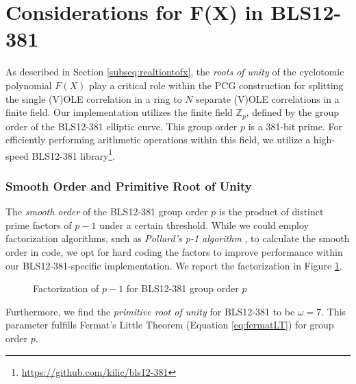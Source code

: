 \section{Considerations for F(X) in BLS12-381}
\label{sec:fxconsiderationsImpl}
As described in Section \ref{subseq:realtiontofx}, the \textit{roots of unity} of the cyclotomic polynomial $F(X)$ play a critical role within the PCG construction for splitting the single (V)OLE correlation in a ring to $N$ separate (V)OLE correlations in a finite field. Our implementation utilizes the finite field $\mathbb{Z}_p$, defined by the group order of the BLS12-381 elliptic curve. This group order $p$ is a 381-bit prime. For efficiently performing arithmetic operations within this field, we utilize a high-speed BLS12-381 library\footnote{\url{https://github.com/kilic/bls12-381}}.

\subsubsection{Smooth Order and Primitive Root of Unity}
The \textit{smooth order} of the BLS12-381 group order $p$ is the product of distinct prime factors of $p-1$ under a certain threshold. While we could employ factorization algorithms, such as \textit{Pollard's p-1 algorithm} \cite{pollard1974theorems}, to calculate the smooth order in code, we opt for hard coding the factors to improve performance within our BLS12-381-specific implementation. We report the factorization in Figure \ref{fig:pminus1factorization}.

\begin{figure}[htbp]
\centering
\setlength{\fboxsep}{10pt}
\caption{Factorization of \(p-1\) for BLS12-381 group order $p$}
\label{fig:pminus1factorization}
\end{figure}

Furthermore, we find the \textit{primitive root of unity} for BLS12-381 to be $\omega = 7$. This parameter fulfills Fermat's Little Theorem (Equation \ref{eq:fermatLT}) for group order $p$.

